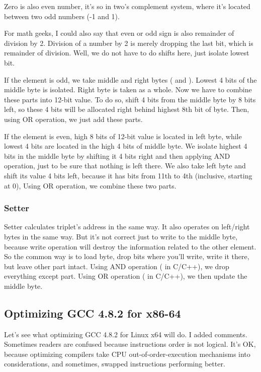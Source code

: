 Zero is also even number, it's so in two's complement system,
where it's located between two odd numbers (-1 and 1).

For math geeks, I could also say that even or odd sign is also remainder of division by 2.
Division of a number by 2 is merely dropping the last bit, which is remainder of division.
Well, we do not have to do shifts here, just isolate lowest bit.

If the element is odd, we take middle and right bytes ( and ).
Lowest 4 bits of the middle byte is isolated.
Right byte is taken as a whole.
Now we have to combine these parts into 12-bit value.
To do so, shift 4 bits from the middle byte by 8 bits left, so these 4 bits will be allocated right behind highest 8th bit of byte.
Then, using OR operation, we just add these parts.

If the element is even, high 8 bits of 12-bit value is located in left byte, while lowest 4 bits are located in the high 4 bits of middle byte.
We isolate highest 4 bits in the middle byte by shifting it 4 bits right and then applying AND operation, just to be sure that nothing is left there.
We also take left byte and shift its value 4 bits left, because it has bits from 11th to 4th (inclusive, starting at 0),
Using OR operation, we combine these two parts.

\subsubsection{Setter}

Setter calculates triplet's address in the same way.
It also operates on left/right bytes in the same way.
But it's not correct just to write to the middle byte, because write operation will destroy the information related to the other element.
So the common way is to load byte, drop bits where you'll write, write it there, but leave other part intact.
Using AND operation (\TT{\&} in C/C++), we drop everything except  part.
Using OR operation (\TT{|} in C/C++), we then update the middle byte.

\subsection{Optimizing GCC 4.8.2 for x86-64}

Let's see what optimizing GCC 4.8.2 for Linux x64 will do.
I added comments.
Sometimes readers are confused because instructions order is not logical.
It's OK, because optimizing compilers take CPU out-of-order-execution mechanisms into considerations, and sometimes,
swapped instructions performing better.


